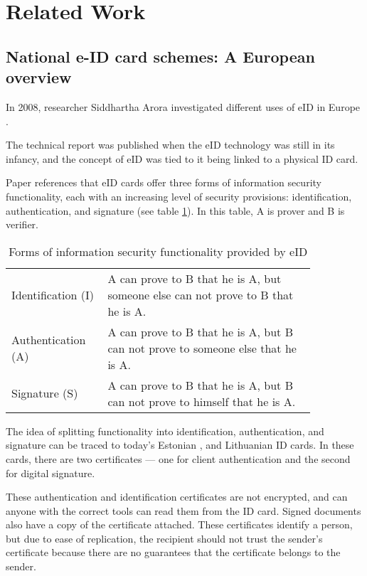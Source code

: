 \section{Related Work}

\subsection{National e-ID card schemes: A European overview}

In 2008, researcher Siddhartha Arora investigated different uses of eID in Europe \cite{ARORA200846}.

The technical report was published when the eID technology was still in its infancy, and the concept of eID was tied to it being linked to a physical ID card.

Paper references that eID cards offer three forms of information security functionality, each with an increasing level of security provisions: identification, authentication, and signature (see table \ref{tab:formsofinfosecurity}). In this table, A is prover and B is verifier.

\begin{table}[h]
    \begin{center}
        \caption{Forms of information security functionality provided by eID \cite{ARORA200846, fiat1986prove}}
        \label{tab:formsofinfosecurity}
        \begin{tabular}{p{0.25\linewidth} | p{0.6\linewidth}}
            Identification (I) & A can prove to B that he is A, but someone else can not prove to B that he is A. \\
            Authentication (A) & A can prove to B that he is A, but B can not prove to someone else that he is A. \\
            Signature (S)      & A can prove to B that he is A, but B can not prove to himself that he is A.
        \end{tabular}
    \end{center}
\end{table}

The idea of splitting functionality into identification, authentication, and signature can be traced to today's Estonian \cite{ee-id-tech}, and Lithuanian \cite{lt-id-howtouse} ID cards. In these cards, there are two certificates — one for client authentication and the second for digital signature.

These authentication and identification certificates are not encrypted, and can anyone with the correct tools can read them from the ID card. Signed documents also have a copy of the certificate attached. These certificates identify a person, but due to ease of replication, the recipient should not trust the sender's certificate because there are no guarantees that the certificate belongs to the sender.

